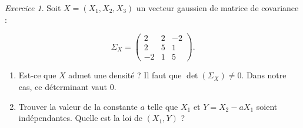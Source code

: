 \documentclass[french]{book}
\theoremstyle{definition}
\theoremstyle{remark}
\newtheorem{exo}{Exercice}
\begin{document}
\begin{exo}
  Soit \(X = (X_1, X_2, X_3)\) un vecteur gaussien de matrice de covariance :

  \[\Sigma_X = \begin{pmatrix}
  2 & 2 & -2 \\
  2 & 5 & 1 \\
  -2 & 1 & 5
  \end{pmatrix}.\]

  \begin{enumerate}
    \item Est-ce que \(X\) admet une densité ? Il faut que \(\operatorname{det}(\Sigma_X) \neq 0\). Dans notre cas, ce déterminant vaut 0.

    \item Trouver la valeur de la constante \(a\) telle que \(X_1\) et \(Y = X_2 - a X_1\) soient indépendantes. Quelle est la loi de \((X_1, Y)\) ?
  \end{enumerate}
\end{exo}
\end{document}
